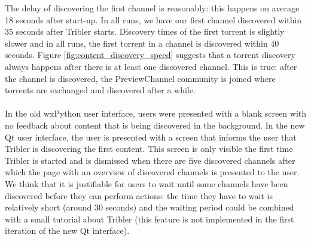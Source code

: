 \noindent The delay of discovering the first channel is reasonably: this happens on average 18 seconds after start-up. In all runs, we have our first channel discovered within 35 seconds after Tribler starts. Discovery times of the first torrent is slightly slower and in all runs, the first torrent in a channel is discovered within 40 seconds. Figure \ref{fig:content_discovery_speed} suggests that a torrent discovery always happens after there is at least one discovered channel. This is true: after the channel is discovered, the PreviewChannel community is joined where torrents are exchanged and discovered after a while.\\\\
In the old wxPython user interface, users were presented with a blank screen with no feedback about content that is being discovered in the background. In the new Qt user interface, the user is presented with a screen that informs the user that Tribler is discovering the first content. This screen is only visible the first time Tribler is started and is dismissed when there are five discovered channels after which the page with an overview of discovered channels is presented to the user. We think that it is justifiable for users to wait until some channels have been discovered before they can perform actions: the time they have to wait is relatively short (around 30 seconds) and the waiting period could be combined with a small tutorial about Tribler (this feature is not implemented in the first iteration of the new Qt interface).

